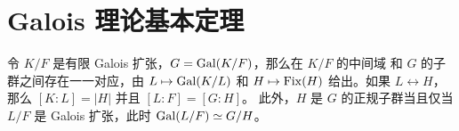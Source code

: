 \section{Galois 理论基本定理}

\begin{theorem}
  令 $K/F$ 是有限 Galois 扩张，$G=\operatorname{Gal}(K/F)$，那么在 $K/F$ 的中间域
  和 $G$ 的子群之间存在一一对应，由 $L\mapsto \operatorname{Gal}(K/L)$ 和 $H\mapsto\operatorname{Fix}(H)$
  给出。如果 $L\leftrightarrow H$，那么 $[K:L]=|H|$ 并且 $[L:F]=[G:H]$。
  此外，$H$ 是 $G$ 的正规子群当且仅当 $L/F$ 是 Galois 扩张，此时
  $\operatorname{Gal}(L/F)\simeq G/H$。
\end{theorem}

\begin{center}
\end{center}







